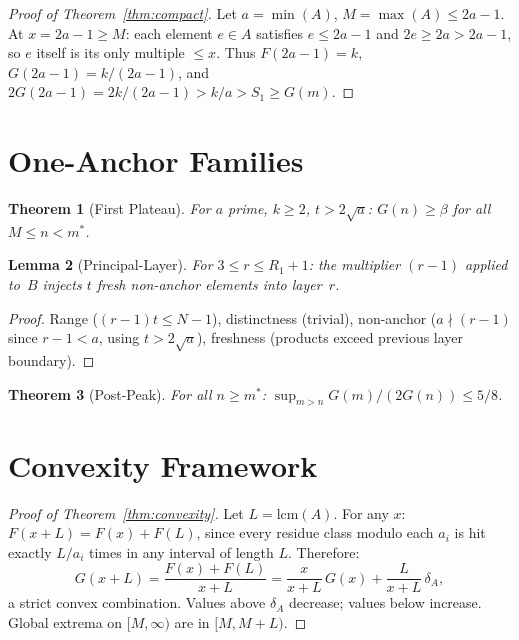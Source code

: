 \documentclass[11pt,a4paper]{article}
\newtheorem{theorem}{Theorem}[section]
\newtheorem{lemma}[theorem]{Lemma}
\theoremstyle{definition}
\begin{document}
\begin{proof}[Proof of Theorem~\ref{thm:compact}]
Let $a = \min(A)$, $M = \max(A) \leq 2a{-}1$. At $x = 2a{-}1 \geq M$:
each element $e \in A$ satisfies $e \leq 2a{-}1$ and $2e \geq 2a > 2a{-}1$,
so $e$ itself is its only multiple $\leq x$. Thus $F(2a{-}1) = k$,
$G(2a{-}1) = k/(2a{-}1)$, and $2G(2a{-}1) = 2k/(2a{-}1) > k/a > S_1
\geq G(m)$.
\end{proof}

\section{One-Anchor Families}

\begin{theorem}[First Plateau]\label{thm:plateau}
For $a$ prime, $k \geq 2$, $t > 2\sqrt{a}$: $G(n) \geq \beta$ for
all $M \leq n < m^*$.
\end{theorem}

\begin{lemma}[Principal-Layer]\label{lem:principal}
For $3 \leq r \leq R_1{+}1$: the multiplier $(r{-}1)$ applied to~$B$
injects $t$ fresh non-anchor elements into layer~$r$.
\end{lemma}

\begin{proof}
Range ($(r{-}1)t \leq N{-}1$), distinctness (trivial), non-anchor
($a \nmid (r{-}1)$ since $r{-}1 < a$, using $t > 2\sqrt{a}$),
freshness (products exceed previous layer boundary).
\end{proof}

\begin{theorem}[Post-Peak]\label{thm:postpeak}
For all $n \geq m^*$: $\sup_{m>n} G(m)/(2G(n)) \leq 5/8$.
\end{theorem}

\section{Convexity Framework}

\begin{proof}[Proof of Theorem~\ref{thm:convexity}]
Let $L = \mathrm{lcm}(A)$. For any $x$:
$F(x + L) = F(x) + F(L)$,
since every residue class modulo each $a_i$ is hit exactly $L/a_i$
times in any interval of length $L$. Therefore:
\[
G(x{+}L) = \frac{F(x) + F(L)}{x + L}
= \frac{x}{x+L}\,G(x) + \frac{L}{x+L}\,\delta_A,
\]
a strict convex combination. Values above $\delta_A$ decrease; values
below increase. Global extrema on $[M, \infty)$ are in $[M, M{+}L)$.
\end{proof}
\end{document}
